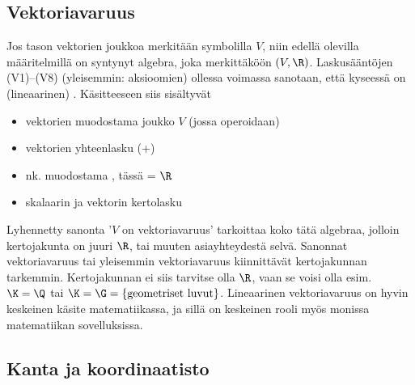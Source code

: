 \subsection*{Vektoriavaruus}
%

Jos tason vektorien joukkoa merkitään symbolilla $V$, niin edellä olevilla määritelmillä on 
syntynyt algebra, joka merkittäköön $(V,\R)$. Laskusääntöjen (V1)--(V8) (yleisemmin:
aksioomien) ollessa voimassa sanotaan, että kyseessä on (lineaarinen) .
Käsitteeseen siis sisältyvät
\begin{itemize}
\item  vektorien muodostama joukko $V$ (jossa operoidaan)
\item  vektorien yhteenlasku (+)
\item  nk.  muodostama , tässä = $\R$
\item  skalaarin ja vektorin kertolasku
\end{itemize}
Lyhennetty sanonta '$V$ on vektoriavaruus' tarkoittaa koko tätä algebraa, jolloin 
kertojakunta on juuri $\R$, tai muuten asiayhteydestä selvä. Sanonnat 
vektoriavaruus tai yleisemmin  vektoriavaruus kiinnittävät kertojakunnan
tarkemmin. Kertojakunnan ei siis tarvitse olla $\R$, vaan se voisi olla esim. $\K=\Q$ tai 
$\K=\G=\{\text{geometriset luvut}\}$. Lineaarinen vektoriavaruus on hyvin keskeinen käsite
matematiikassa, ja sillä on keskeinen rooli myös monissa matematiikan sovelluksissa.

\subsection*{Kanta ja koordinaatisto}

